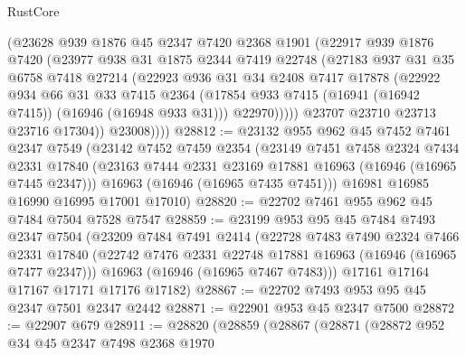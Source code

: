 \begin{lexlean}{RustCore}
\begin{coremodule}
              (@23628
                @939
                @1876
                @45
                @2347
                @7420
                @2368
                @1901
                (@22917
                  @939
                  @1876
                  @7420
                  (@23977
                    @938
                    @31
                    @1875
                    @2344
                    @7419
                    @22748
                    (@27183
                      @937
                      @31
                      @35
                      @6758
                      @7418
                      @27214
                      (@22923
                        @936
                        @31
                        @34
                        @2408
                        @7417
                        @17878
                        (@22922
                          @934
                          @66
                          @31
                          @33
                          @7415
                          @2364
                          (@17854 @933 @7415 (@16941 (@16942 @7415)) (@16946 (@16948 @933 @31)))
                          @22970)))))
                @23707
                @23710
                @23713
                @23716
                @17304))
            @23008))))
@28812 := @23132
    @955
    @962
    @45
    @7452
    @7461
    @2347
    @7549
    (@23142
      @7452
      @7459
      @2354
      (@23149
        @7451
        @7458
        @2324
        @7434
        @2331
        @17840
        (@23163 @7444 @2331 @23169 @17881 @16963 (@16946 (@16965 @7445 @2347)))
        @16963
        (@16946 (@16965 @7435 @7451)))
      @16981
      @16985
      @16990
      @16995
      @17001
      @17010)
@28820 := @22702 @7461 @955 @962 @45 @7484 @7504 @7528 @7547
@28859 := @23199
    @953
    @95
    @45
    @7484
    @7493
    @2347
    @7504
    (@23209
      @7484
      @7491
      @2414
      (@22728
        @7483
        @7490
        @2324
        @7466
        @2331
        @17840
        (@22742 @7476 @2331 @22748 @17881 @16963 (@16946 (@16965 @7477 @2347)))
        @16963
        (@16946 (@16965 @7467 @7483)))
      @17161
      @17164
      @17167
      @17171
      @17176
      @17182)
@28867 := @22702 @7493 @953 @95 @45 @2347 @7501 @2347 @2442
@28871 := @22901 @953 @45 @2347 @7500
@28872 := @22907 @679
@28911 := @28820
    (@28859
      (@28867
        (@28871
          (@28872
            @952
            @34
            @45
            @2347
            @7498
            @2368
            @1970

\end{coremodule}
\end{lexlean}
